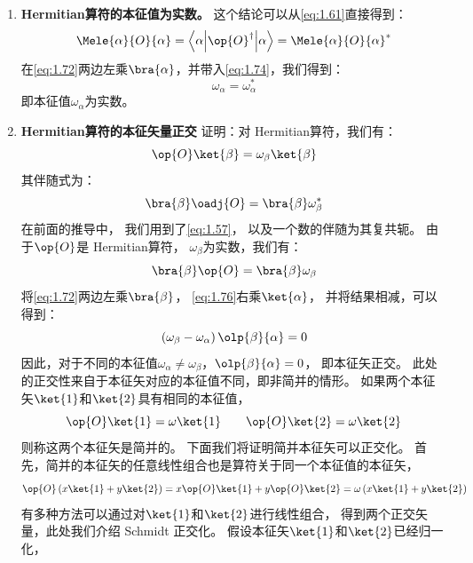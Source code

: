 \begin{enumerate}[]
 \item {\bfseries Hermitian算符的本征值为实数。} 这个结论可以从\autoref{eq:1.61}直接得到：
 \begin{equation}
     \Mele{\alpha}{O}{\alpha} = \left\langle\alpha\middle\vert\op{O}^\dagger\middle\vert\alpha\right\rangle = {\Mele{\alpha}{O}{\alpha}}^\ast
     \label{eq:1.74}
 \end{equation}
 在\autoref{eq:1.72}两边左乘$\bra{\alpha}$，并带入\autoref{eq:1.74}，我们得到：
 \begin{equation}
     \omega_\alpha = \omega_\alpha^\ast
     \label{eq:1.75}
 \end{equation}
 即本征值$\omega_\alpha$为实数。
 
 \item {\bfseries Hermitian算符的本征矢量正交} 证明：对 Hermitian算符，我们有：
 \[\op{O}\ket{\beta} = \omega_\beta \ket{\beta}\]
 其伴随式为：
 \[\bra{\beta}\oadj{O} = \bra{\beta}\omega_\beta^\ast\]
 在前面的推导中，
 我们用到了\autoref{eq:1.57}，
 以及一个数的伴随为其复共轭。
 由于$\op{O}$是 Hermitian算符，
 $\omega_\beta$为实数，我们有：
 \begin{equation}
     \bra{\beta}\op{O} = \bra{\beta}\omega_\beta
     \label{eq:1.76}
 \end{equation}
 将\autoref{eq:1.72}两边左乘$\bra{\beta}$，
 \autoref{eq:1.76}右乘$\ket{\alpha}$，
 并将结果相减，可以得到：
 \begin{equation}
     \left(\omega_\beta - \omega_\alpha\right)\olp{\beta}{\alpha} = 0
     \label{eq:1.77}
 \end{equation}
 因此，对于不同的本征值$\omega_\alpha \neq \omega_\beta$，$\olp{\beta}{\alpha} = 0$，
 即本征矢正交。
 此处的正交性来自于本征矢对应的本征值不同，即非简并的情形。
 如果两个本征矢$\ket{1}$和$\ket{2}$具有相同的本征值，
 \begin{equation}
     \op{O}\ket{1} = \omega\ket{1} \qquad \op{O}\ket{2} = \omega\ket{2}
     \label{eq:1.78}
 \end{equation}
 则称这两个本征矢是简并的。
 下面我们将证明简并本征矢可以正交化。
 首先，简并的本征矢的任意线性组合也是算符关于同一个本征值的本征矢，
 \begin{equation}
     \op{O}\left(x\ket{1}+y\ket{2}\right) = x\op{O}\ket{1} + y\op{O}\ket{2} = \omega\left(x\ket{1}+y\ket{2}\right)
     \label{eq:1.79}
 \end{equation}
 有多种方法可以通过对$\ket{1}$和$\ket{2}$进行线性组合，
 得到两个正交矢量，此处我们介绍 Schmidt 正交化。
 假设本征矢$\ket{1}$和$\ket{2}$已经归一化，

\end{enumerate}
